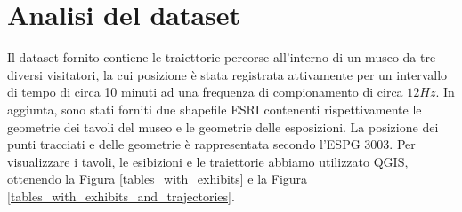 \documentclass[12pt]{article}
\begin{document}
\section{Analisi del dataset}
Il dataset fornito contiene le traiettorie percorse all'interno di un museo da tre diversi visitatori, la cui posizione è stata registrata attivamente per un intervallo di tempo di circa 10 minuti ad una frequenza di compionamento di circa $12Hz$.
In aggiunta, sono stati forniti due shapefile ESRI contenenti rispettivamente le geometrie dei tavoli del museo e le geometrie delle esposizioni.
La posizione dei punti tracciati e delle geometrie è rappresentata secondo l'ESPG 3003.
Per visualizzare i tavoli, le esibizioni e le traiettorie abbiamo utilizzato QGIS, ottenendo la Figura \ref{tables_with_exhibits} e la Figura \ref{tables_with_exhibits_and_trajectories}.
\end{document}
